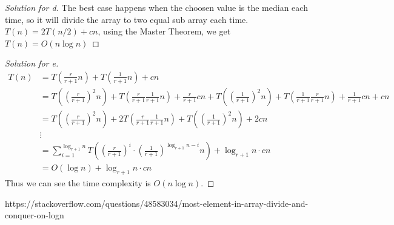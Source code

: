 \documentclass[12pt]{article}
\begin{document}
\begin{proof}[Solution for d]
	The best case happens when the choosen value is the median each time, so it will divide the array to two equal sub array each time. $T(n) = 2T(n/2) + cn$, using the Master Theorem, we get $T(n) = O(n\log n)$
\end{proof}

\begin{proof}[Solution for e]
	\begin{align*}
		T(n)&=T(\frac{r}{r+1}n)+T(\frac{1}{r+1}n)+cn\\
		&=T((\frac{r}{r+1})^2n)+T(\frac{r}{r+1}\frac{1}{r+1}n)+\frac{r}{r+1}cn+T((\frac{1}{r+1})^2n)+T(\frac{1}{r+1}\frac{r}{r+1}n)+\frac{1}{r+1}cn+cn\\
		&=T((\frac{r}{r+1})^2n)+2T(\frac{r}{r+1}\frac{1}{r+1}n)+T((\frac{1}{r+1})^2n)+2cn\\
		&\vdots\\
		&=\sum_{i=1}^{\log_{r+1}n}T((\frac{r}{r+1})^i \cdot (\frac{1}{r+1})^{\log_{r+1}n-i}n) + \log_{r+1}n\cdot cn\\
		&=O(\log n)+ \log_{r+1}n\cdot cn
	\end{align*}
	Thus we can see the time complexity is $O(n\log n)$.
\end{proof}

\bigskip




\begin{thebibliography}{so}
 https://stackoverflow.com/questions/48583034/most-element-in-array-divide-and-conquer-on-logn
\end{thebibliography}
\end{document}
